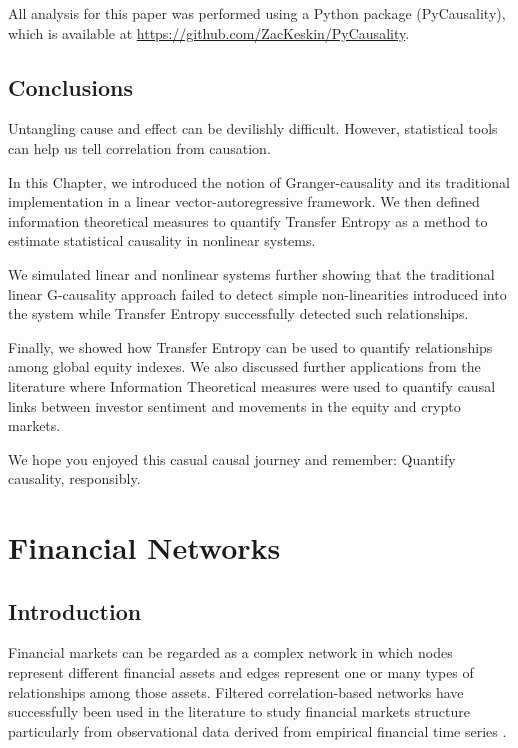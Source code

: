 \documentclass[]{book}
\theoremstyle{definition}
\theoremstyle{definition}
\theoremstyle{definition}
\theoremstyle{remark}
\begin{document}
All analysis for this paper was performed using a Python package
(PyCausality), which is available at
\url{https://github.com/ZacKeskin/PyCausality}.

\section{Conclusions}\label{conclusions}

Untangling cause and effect can be devilishly difficult. However,
statistical tools can help us tell correlation from causation.

In this Chapter, we introduced the notion of Granger-causality and its
traditional implementation in a linear vector-autoregressive framework.
We then defined information theoretical measures to quantify Transfer
Entropy as a method to estimate statistical causality in nonlinear
systems.

We simulated linear and nonlinear systems further showing that the
traditional linear G-causality approach failed to detect simple
non-linearities introduced into the system while Transfer Entropy
successfully detected such relationships.

Finally, we showed how Transfer Entropy can be used to quantify
relationships among global equity indexes. We also discussed further
applications from the literature where Information Theoretical measures
were used to quantify causal links between investor sentiment and
movements in the equity and crypto markets.

We hope you enjoyed this casual causal journey and remember: Quantify
causality, responsibly.

\chapter{Financial Networks}\label{financial-networks}

\section{Introduction}\label{introduction-2}

Financial markets can be regarded as a complex network in which nodes
represent different financial assets and edges represent one or many
types of relationships among those assets. Filtered correlation-based
networks have successfully been used in the literature to study
financial markets structure particularly from observational data derived
from empirical financial time series
\citep[\citet{Tumminello26072005}]{bardoscia2017pathways, 10.1371/journal.pone.0017994, Mantegna1999, aste2010correlation, Tumminello201040}.
\end{document}
